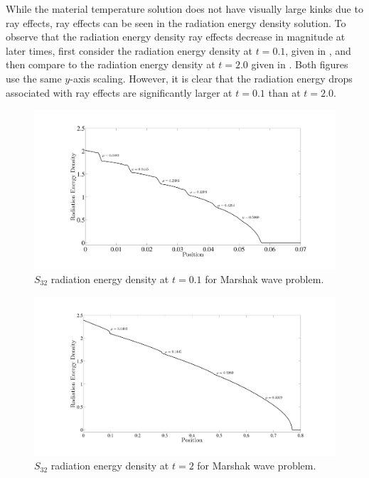 While the material temperature solution does not have visually large kinks due to ray effects, ray effects can be seen in the radiation energy density solution.
To observe that the radiation energy density ray effects decrease in magnitude at later times, first consider the radiation energy density at $t=0.1$, given in , and then compare to the radiation energy density at $t=2.0$ given in .  
Both figures use the same $y$-axis scaling.  
However, it is clear that the radiation energy drops associated with ray effects are significantly larger at $t=0.1$ than at $t=2.0$.
\begin{figure}[!htp]
\centering
\includegraphics[width=17cm,trim=2in  0.5in 0.5in 0.75in,clip=true]{chapter6_grey_radtran/Dissertation_Data/S32_T01_Radiation_Equal_Height.pdf}
\caption{$S_{32}$ radiation energy density at $t=0.1$ for Marshak wave problem.}
\label{fig:t01_radiation_energy}
\end{figure}
\begin{figure}[!hbp]
\centering
\includegraphics[width=17cm,trim=2in  0.4in 0.5in 0.75in,clip=true]{chapter6_grey_radtran/Dissertation_Data/S32_T2_Radiation.pdf}
\caption{$S_{32}$ radiation energy density at $t=2$ for Marshak wave problem.}
\label{fig:t2_radiation_energy}
\end{figure}
